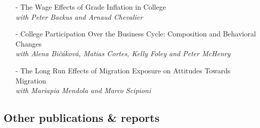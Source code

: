 \documentclass[11pt]{article}
\begin{document}
\begin{itemize}[itemsep=0pt, leftmargin=20pt]
\item [-]{The Wage Effects of Grade Inflation in College}\\
\emph{with Peter Backus and Arnaud Chevalier}
\item [-]College Participation Over the Business Cycle: Composition and Behavioral Changes\\
\emph{with Alena Bi\v{c}\'{a}kov\'{a}, Matias Cortes, Kelly Foley and Peter McHenry}
\item [-]{The Long Run Effects of Migration Exposure on Attitudes Towards Migration}\\
\emph{with Mariapia Mendola and Marco Scipioni}
\end{itemize}

\subsection*{\sc Other publications \& reports}
\end{document}
